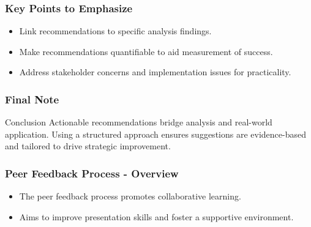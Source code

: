 \documentclass[aspectratio=169]{beamer}
\begin{document}
\begin{frame}[fragile]
    \frametitle{Key Points to Emphasize}
    \begin{itemize}
        \item Link recommendations to specific analysis findings.
        \item Make recommendations quantifiable to aid measurement of success.
        \item Address stakeholder concerns and implementation issues for practicality.
    \end{itemize}
\end{frame}

\begin{frame}[fragile]
    \frametitle{Final Note}
    \begin{block}{Conclusion}
        Actionable recommendations bridge analysis and real-world application. Using a structured approach ensures suggestions are evidence-based and tailored to drive strategic improvement.
    \end{block}
\end{frame}

\begin{frame}[fragile]
    \frametitle{Peer Feedback Process - Overview}
    \begin{itemize}
        \item The peer feedback process promotes collaborative learning.
        \item Aims to improve presentation skills and foster a supportive environment.
    \end{itemize}
\end{frame}
\end{document}
